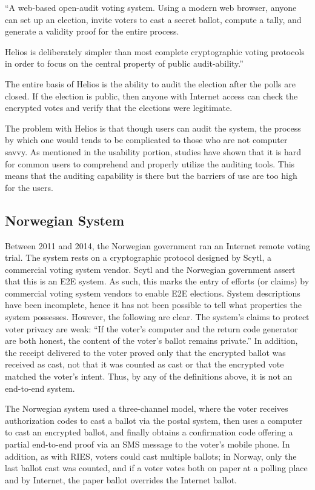 ``A web-based open-audit voting system. Using a modern web browser,
anyone can set up an election, invite voters to cast a secret ballot,
compute a tally, and generate a validity proof for the entire process.

Helios is deliberately simpler than most complete cryptographic voting
protocols in order to focus on the central property of public
audit-ability.''~\cite{adida2008}

The entire basis of Helios is the ability to audit the election after
the polls are closed. If the election is public, then anyone with
Internet access can check the encrypted votes and verify that the
elections were legitimate.

The problem with Helios is that though users can audit the system, the
process by which one would tends to be complicated to those who are
not computer savvy. As mentioned in the usability portion, studies
have shown that it is hard for common users to comprehend and properly
utilize the auditing tools. This means that the auditing capability is
there but the barriers of use are too high for the users.

\subsection{Norwegian System~\cite{gjosteen2012}}

Between 2011 and 2014, the Norwegian government ran an Internet remote
voting trial. The system rests on a cryptographic protocol designed
by Scytl, a commercial voting system vendor. Scytl and the Norwegian
government assert that this is an E2E system. As such, this marks the
entry of efforts (or claims) by commercial voting system vendors to
enable E2E elections. System descriptions have been incomplete, hence
it has not been possible to tell what properties the system
possesses. However, the following are clear. The system's claims to
protect voter privacy are weak: ``If the voter's computer and the
return code generator are both honest, the content of the voter's
ballot remains private.''  In addition, the receipt delivered to the
voter proved only that the encrypted ballot was received as cast, not
that it was counted as cast or that the encrypted vote matched the
voter's intent. Thus, by any of the definitions above, it is not an
end-to-end system.

The Norwegian system used a three-channel model, where the voter
receives authorization codes to cast a ballot via the postal system,
then uses a computer to cast an encrypted ballot, and finally obtains
a confirmation code offering a partial end-to-end proof via an SMS
message to the voter's mobile phone. In addition, as with RIES,
voters could cast multiple ballots; in Norway, only the last ballot
cast was counted, and if a voter votes both on paper at a polling
place and by Internet, the paper ballot overrides the Internet ballot.

